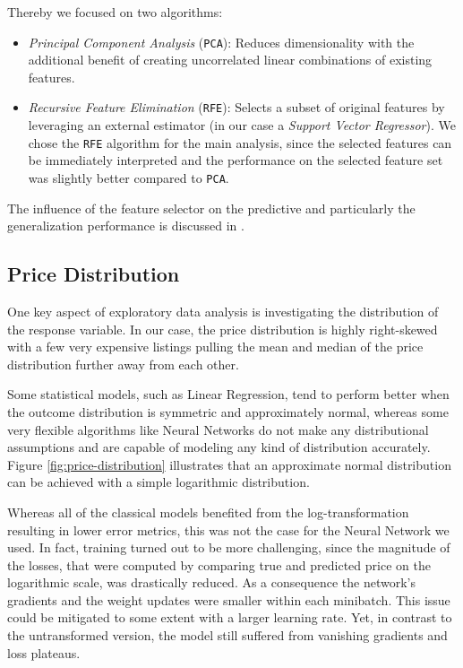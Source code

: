 Thereby we focused on two algorithms:
\begin{itemize}
  \item \emph{Principal Component Analysis} (\texttt{PCA}):
        Reduces dimensionality with the additional benefit of creating uncorrelated linear combinations of existing features.
  \item \emph{Recursive Feature Elimination} (\texttt{RFE}):
        Selects a subset of original features by leveraging an external estimator (in our case a \emph{Support Vector Regressor}).
        We chose the \texttt{RFE} algorithm for the main analysis, since the selected features can be immediately interpreted and the performance on the selected feature set was slightly better compared to \texttt{PCA}.

\end{itemize}

The influence of the feature selector on the predictive and particularly the generalization performance is discussed in .

\subsection{Price Distribution} \label{appendix:price-distribution}

One key aspect of exploratory data analysis is investigating the distribution of the response variable.
In our case, the price distribution is highly right-skewed with a few very expensive listings pulling the mean and median of the price distribution further away from each other.

Some statistical models, such as Linear Regression, tend to perform better when the outcome distribution is symmetric and approximately normal, whereas some very flexible algorithms like Neural Networks do not make any distributional assumptions and are capable of modeling any kind of distribution accurately.
Figure \ref{fig:price-distribution} illustrates that an approximate normal distribution can be achieved with a simple logarithmic distribution.

Whereas all of the classical models benefited from the log-transformation resulting in lower error metrics, this was not the case for the Neural Network we used.
In fact, training turned out to be more challenging, since the magnitude of the losses, that were computed by comparing true and predicted price on the logarithmic scale, was drastically reduced.
As a consequence the network's gradients and the weight updates were smaller within each minibatch.
This issue could be mitigated to some extent with a larger learning rate.
Yet, in contrast to the untransformed version, the model still suffered from vanishing gradients and loss plateaus.

